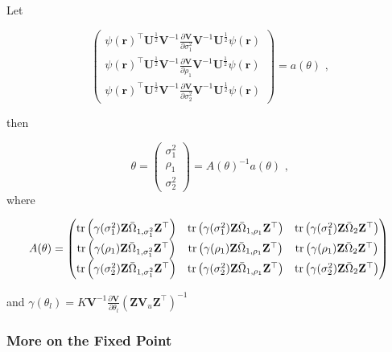 Let

\[
\left(\begin{matrix}
\psi(\mathbf{r})^\top\mathbf{U}^{\frac{1}{2}}\mathbf{V}^{-1}\frac{\partial\mathbf{V}}{\partial\sigma_1^2}\mathbf{V}^{-1}\mathbf{U}^{\frac{1}{2}} \psi(\mathbf{r}) \\
\psi(\mathbf{r})^\top\mathbf{U}^{\frac{1}{2}}\mathbf{V}^{-1}\frac{\partial\mathbf{V}}{\partial\rho_1}\mathbf{V}^{-1}\mathbf{U}^{\frac{1}{2}} \psi(\mathbf{r}) \\
\psi(\mathbf{r})^\top\mathbf{U}^{\frac{1}{2}}\mathbf{V}^{-1}\frac{\partial\mathbf{V}}{\partial\sigma_2^2}\mathbf{V}^{-1}\mathbf{U}^{\frac{1}{2}} \psi(\mathbf{r})
\end{matrix}\right)
= a(\theta) \text{ ,}
\]

then

\[
\theta = \left(\begin{matrix}
\sigma_1^2 \\
\rho_1 \\
\sigma_2^2
\end{matrix}\right) = A(\theta)^{-1} a(\theta) \text{ ,}
\] where

\begin{align*}
A(\theta) = \left(\begin{matrix}
\operatorname{tr}\left(\gamma(\sigma_1^2) \mathbf{Z}\bar{\Omega}_{1,\sigma_1^2} \mathbf{Z}^\top \right) & \operatorname{tr}\left(\gamma(\sigma_1^2) \mathbf{Z}\bar{\Omega}_{1,\rho_1} \mathbf{Z}^\top \right) &
\operatorname{tr}\left(\gamma(\sigma_1^2) \mathbf{Z}\bar{\Omega}_2\mathbf{Z}^\top \right) \\
\operatorname{tr}\left(\gamma(\rho_1) \mathbf{Z}\bar{\Omega}_{1,\sigma_1^2} \mathbf{Z}^\top \right) & \operatorname{tr}\left(\gamma(\rho_1) \mathbf{Z}\bar{\Omega}_{1,\rho_1} \mathbf{Z}^\top \right) &
\operatorname{tr}\left(\gamma(\rho_1) \mathbf{Z}\bar{\Omega}_2\mathbf{Z}^\top \right) \\
\operatorname{tr}\left(\gamma(\sigma_2^2) \mathbf{Z}\bar{\Omega}_{1,\sigma_1^2} \mathbf{Z}^\top \right) & \operatorname{tr}\left(\gamma(\sigma_2^2) \mathbf{Z}\bar{\Omega}_{1,\rho_1} \mathbf{Z}^\top \right) &
\operatorname{tr}\left(\gamma(\sigma_2^2) \mathbf{Z}\bar{\Omega}_2\mathbf{Z}^\top \right)
\end{matrix}\right)
\end{align*}

and
$\gamma(\theta_l) = K\mathbf{V}^{-1}\frac{\partial\mathbf{V}}{\partial\theta_l} (\mathbf{Z}\mathbf{V}_u\mathbf{Z}^\top)^{-1}$

\subsubsection{More on the Fixed Point}\label{more-on-the-fixed-point}

